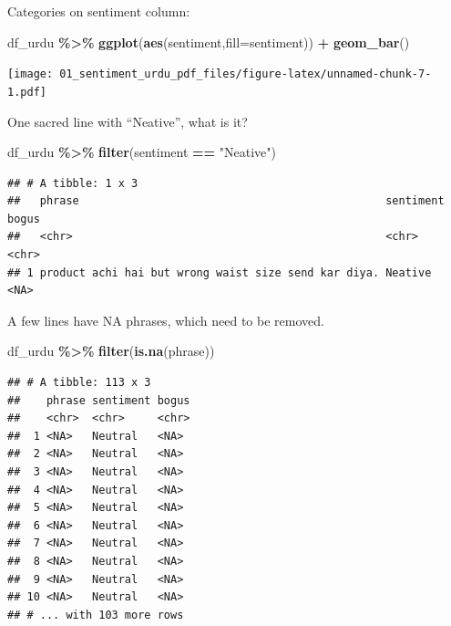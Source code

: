 \documentclass[
]{article}
\newenvironment{Shaded}{\begin{snugshade}}{\end{snugshade}}
\newcommand{\DataTypeTok}[1]{\textcolor[rgb]{0.13,0.29,0.53}{#1}}
\newcommand{\KeywordTok}[1]{\textcolor[rgb]{0.13,0.29,0.53}{\textbf{#1}}}
\newcommand{\NormalTok}[1]{#1}
\newcommand{\OperatorTok}[1]{\textcolor[rgb]{0.81,0.36,0.00}{\textbf{#1}}}
\newcommand{\StringTok}[1]{\textcolor[rgb]{0.31,0.60,0.02}{#1}}
\begin{document}
Categories on sentiment column:

\begin{Shaded}
\begin{Highlighting}[]
\NormalTok{df\_urdu }\OperatorTok{\%\textgreater{}\%}
\StringTok{  }\KeywordTok{ggplot}\NormalTok{(}\KeywordTok{aes}\NormalTok{(sentiment,}\DataTypeTok{fill=}\NormalTok{sentiment)) }\OperatorTok{+}
\StringTok{  }\KeywordTok{geom\_bar}\NormalTok{()}
\end{Highlighting}
\end{Shaded}

\texttt{[image: 01\_sentiment\_urdu\_pdf\_files/figure-latex/unnamed-chunk-7-1.pdf]}

One sacred line with ``Neative'', what is it?

\begin{Shaded}
\begin{Highlighting}[]
\NormalTok{df\_urdu }\OperatorTok{\%\textgreater{}\%}\StringTok{ }\KeywordTok{filter}\NormalTok{(sentiment }\OperatorTok{==}\StringTok{ "Neative"}\NormalTok{)}
\end{Highlighting}
\end{Shaded}

\begin{verbatim}
## # A tibble: 1 x 3
##   phrase                                               sentiment bogus
##   <chr>                                                <chr>     <chr>
## 1 product achi hai but wrong waist size send kar diya. Neative   <NA>
\end{verbatim}

A few lines have NA phrases, which need to be removed.

\begin{Shaded}
\begin{Highlighting}[]
\NormalTok{df\_urdu }\OperatorTok{\%\textgreater{}\%}
\StringTok{  }\KeywordTok{filter}\NormalTok{(}\KeywordTok{is.na}\NormalTok{(phrase))}
\end{Highlighting}
\end{Shaded}

\begin{verbatim}
## # A tibble: 113 x 3
##    phrase sentiment bogus
##    <chr>  <chr>     <chr>
##  1 <NA>   Neutral   <NA> 
##  2 <NA>   Neutral   <NA> 
##  3 <NA>   Neutral   <NA> 
##  4 <NA>   Neutral   <NA> 
##  5 <NA>   Neutral   <NA> 
##  6 <NA>   Neutral   <NA> 
##  7 <NA>   Neutral   <NA> 
##  8 <NA>   Neutral   <NA> 
##  9 <NA>   Neutral   <NA> 
## 10 <NA>   Neutral   <NA> 
## # ... with 103 more rows
\end{verbatim}
\end{document}
